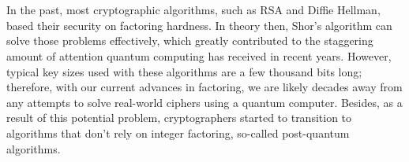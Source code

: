\\\\
In the past, most cryptographic algorithms, such as RSA and Diffie Hellman, based their security on factoring hardness. In theory then, Shor's algorithm can solve those problems effectively, which greatly contributed to the staggering amount of attention quantum computing has received in recent years. However, typical key sizes used with these algorithms are a few thousand bits long; therefore, with our current advances in factoring, we are likely decades away from any attempts to solve real-world ciphers using a quantum computer. Besides, as a result of this potential problem, cryptographers started to transition to algorithms that don't rely on integer factoring, so-called post-quantum algorithms. 